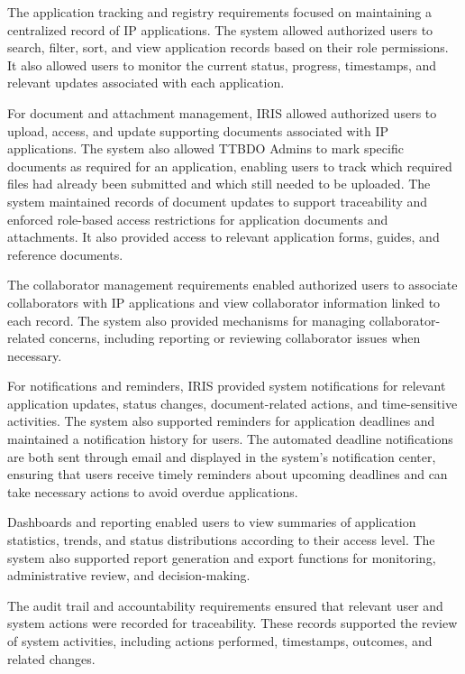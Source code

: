 The application tracking and registry requirements focused on maintaining a centralized record of IP applications. The system allowed authorized users to search, filter, sort, and view application records based on their role permissions. It also allowed users to monitor the current status, progress, timestamps, and relevant updates associated with each application.

For document and attachment management, IRIS allowed authorized users to upload, access, and update supporting documents associated with IP applications. The system also allowed TTBDO Admins to mark specific documents as required for an application, enabling users to track which required files had already been submitted and which still needed to be uploaded. The system maintained records of document updates to support traceability and enforced role-based access restrictions for application documents and attachments. It also provided access to relevant application forms, guides, and reference documents.

The collaborator management requirements enabled authorized users to associate collaborators with IP applications and view collaborator information linked to each record. The system also provided mechanisms for managing collaborator-related concerns, including reporting or reviewing collaborator issues when necessary.

For notifications and reminders, IRIS provided system notifications for relevant application updates, status changes, document-related actions, and time-sensitive activities. The system also supported reminders for application deadlines and maintained a notification history for users.
The automated deadline notifications are both sent through email and displayed in the system's notification center, ensuring that users receive timely reminders about upcoming deadlines and can take necessary actions to avoid overdue applications.

Dashboards and reporting enabled users to view summaries of application statistics, trends, and status distributions according to their access level. The system also supported report generation and export functions for monitoring, administrative review, and decision-making.

The audit trail and accountability requirements ensured that relevant user and system actions were recorded for traceability. These records supported the review of system activities, including actions performed, timestamps, outcomes, and related changes.

